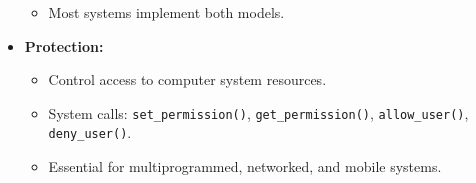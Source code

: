 \begin{itemize}
\begin{itemize}
\begin{itemize}
        \end{itemize}
        \item Most systems implement both models.
    \end{itemize}
    \item \textbf{Protection:}
    \begin{itemize}
        \item Control access to computer system resources.
        \item System calls: \texttt{set\_permission()}, \texttt{get\_permission()}, \texttt{allow\_user()}, \texttt{deny\_user()}.
        \item Essential for multiprogrammed, networked, and mobile systems.
    \end{itemize}
\end{itemize}


